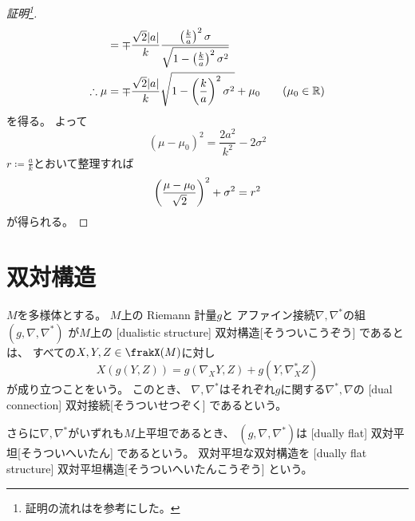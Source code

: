 \documentclass[report]{jlreq}
\begin{document}
\begin{proof}[証明\footnote{
    証明の流れは\cite[Chap.3 14.4]{Tu17}を参考にした。
}]
\begin{alignat}{1}
            &=
                \mp \frac{\sqrt{2} |a|}{k}
                \frac{
                    \left({
                        \frac{k}{a}
                    }\right)^2
                    \sigma
                }{
                    \sqrt{
                        1 - \left({
                            \frac{k}{a}
                        }\right)^2
                        \sigma^2
                    }
                }
                \\
        \therefore \mu
            &=
                \mp \frac{\sqrt{2} |a|}{k}
                \sqrt{
                    1 - \left({
                        \frac{k}{a}
                    }\right)^2
                    \sigma^2
                }
                + \mu_0
                \qquad
                (\mu_0 \in \mathbb{R})
    \end{alignat}
    を得る。
    よって
    \begin{equation}
        (\mu - \mu_0)^2
            =
                \frac{2 a^2}{k^2}
                - 2 \sigma^2
    \end{equation}
    $r \coloneqq \frac{a}{k}$とおいて整理すれば
    \begin{equation}
        \left({
            \frac{\mu - \mu_0}{\sqrt{2}}
        }\right)^2
            + \sigma^2
            = r^2
    \end{equation}
    が得られる。
\end{proof}

%
\section{双対構造}


\begin{definition}[双対構造]
    $M$を多様体とする。
    $M$上の
    Riemann 計量$g$と
    アファイン接続$\nabla, \nabla^*$の組
    $(g, \nabla, \nabla^*)$
    が$M$上の
    [dualistic structure]
        {双対構造}[そうついこうぞう]
    であるとは、
    すべての$X, Y, Z \in \frakX(M)$に対し
    \begin{equation}
        X(g(Y, Z))
            =
                g(\nabla_X Y, Z) + g(Y, \nabla^*_X Z)
    \end{equation}
    が成り立つことをいう。
    このとき、
    $\nabla, \nabla^*$はそれぞれ$g$に関する$\nabla^*, \nabla$の
    [dual connection]
        {双対接続}[そうついせつぞく]
    であるという。

    さらに$\nabla, \nabla^*$がいずれも$M$上平坦であるとき、
    $(g, \nabla, \nabla^*)$は
    [dually flat]
        {双対平坦}[そうついへいたん]
    であるという。
    双対平坦な双対構造を
    [dually flat structure]
        {双対平坦構造}[そうついへいたんこうぞう]
    という。
\end{definition}
\end{document}
